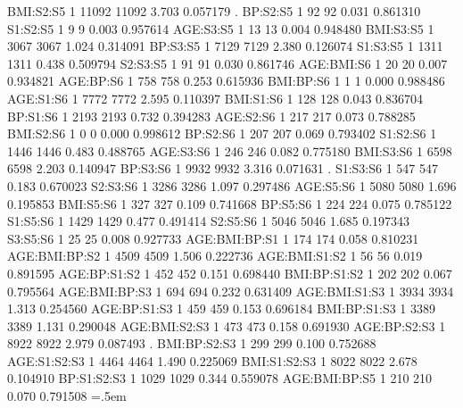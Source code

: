 \documentclass[runningheads]{llncs}
\newenvironment{lcverbatim}
 {\SaveVerbatim{cverb}}
 {\endSaveVerbatim
  \flushleft\fboxrule=0pt\fboxsep=.5em
  \colorbox{cverbbg}{%
    \makebox[\dimexpr\linewidth-2\fboxsep][l]{\BUseVerbatim{cverb}}%
  }
  \endflushleft
}
\begin{document}
\begin{lcverbatim}
BMI:S2:S5               1  11092   11092   3.703 0.057179 .  
BP:S2:S5                1     92      92   0.031 0.861310    
S1:S2:S5                1      9       9   0.003 0.957614    
AGE:S3:S5               1     13      13   0.004 0.948480    
BMI:S3:S5               1   3067    3067   1.024 0.314091    
BP:S3:S5                1   7129    7129   2.380 0.126074    
S1:S3:S5                1   1311    1311   0.438 0.509794    
S2:S3:S5                1     91      91   0.030 0.861746    
AGE:BMI:S6              1     20      20   0.007 0.934821    
AGE:BP:S6               1    758     758   0.253 0.615936    
BMI:BP:S6               1      1       1   0.000 0.988486    
AGE:S1:S6               1   7772    7772   2.595 0.110397    
BMI:S1:S6               1    128     128   0.043 0.836704    
BP:S1:S6                1   2193    2193   0.732 0.394283    
AGE:S2:S6               1    217     217   0.073 0.788285    
BMI:S2:S6               1      0       0   0.000 0.998612    
BP:S2:S6                1    207     207   0.069 0.793402    
S1:S2:S6                1   1446    1446   0.483 0.488765    
AGE:S3:S6               1    246     246   0.082 0.775180    
BMI:S3:S6               1   6598    6598   2.203 0.140947    
BP:S3:S6                1   9932    9932   3.316 0.071631 .  
S1:S3:S6                1    547     547   0.183 0.670023    
S2:S3:S6                1   3286    3286   1.097 0.297486    
AGE:S5:S6               1   5080    5080   1.696 0.195853    
BMI:S5:S6               1    327     327   0.109 0.741668    
BP:S5:S6                1    224     224   0.075 0.785122    
S1:S5:S6                1   1429    1429   0.477 0.491414    
S2:S5:S6                1   5046    5046   1.685 0.197343    
S3:S5:S6                1     25      25   0.008 0.927733    
AGE:BMI:BP:S1           1    174     174   0.058 0.810231    
AGE:BMI:BP:S2           1   4509    4509   1.506 0.222736    
AGE:BMI:S1:S2           1     56      56   0.019 0.891595    
AGE:BP:S1:S2            1    452     452   0.151 0.698440    
BMI:BP:S1:S2            1    202     202   0.067 0.795564    
AGE:BMI:BP:S3           1    694     694   0.232 0.631409    
AGE:BMI:S1:S3           1   3934    3934   1.313 0.254560    
AGE:BP:S1:S3            1    459     459   0.153 0.696184    
BMI:BP:S1:S3            1   3389    3389   1.131 0.290048    
AGE:BMI:S2:S3           1    473     473   0.158 0.691930    
AGE:BP:S2:S3            1   8922    8922   2.979 0.087493 .  
BMI:BP:S2:S3            1    299     299   0.100 0.752688    
AGE:S1:S2:S3            1   4464    4464   1.490 0.225069    
BMI:S1:S2:S3            1   8022    8022   2.678 0.104910    
BP:S1:S2:S3             1   1029    1029   0.344 0.559078    
AGE:BMI:BP:S5           1    210     210   0.070 0.791508    
\end{lcverbatim}
\end{document}
